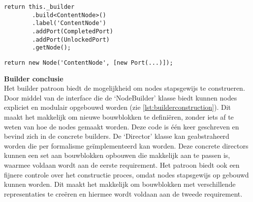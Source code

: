 \lstset{language=JavaScript}
\begin{lstlisting}[caption={Constructie stap voor stap door de 'Director', geschreven in TypeScript.},captionpos=b,label={lst:builderconstruction}]
    return this._builder
        .build<ContentNode>()
        .label('ContentNode')
        .addPort(CompletedPort)
        .addPort(UnlockedPort)
        .getNode();
\end{lstlisting}

\lstset{language=JavaScript}
\begin{lstlisting}[caption={Directe instantiatie door constructor.},captionpos=b,label={lst:constructionbyconstructor}]
    return new Node('ContentNode', [new Port(...)]);
\end{lstlisting}

\noindent\textbf{Builder conclusie}\\
Het builder patroon biedt de mogelijkheid om nodes stapsgewijs te construeren. Door middel van de interface die de ‘NodeBuilder’ klasse biedt kunnen nodes expliciet en modulair opgebouwd worden (zie \autoref{lst:builderconstruction}). Dit maakt het makkelijk om nieuwe bouwblokken te definiëren, zonder iets af te weten van hoe de nodes gemaakt worden. Deze code is één keer geschreven en bevind zich in de concrete builders. De ‘Director’ klasse kan geabstraheerd worden die per formalisme geïmplementeerd kan worden. Deze concrete directors kunnen een set aan bouwblokken opbouwen die makkelijk aan te passen is, waarmee voldaan wordt aan de eerste requirement. Het patroon biedt ook een fijnere controle over het constructie proces, omdat nodes stapsgewijs op gebouwd kunnen worden. Dit maakt het makkelijk om bouwblokken met verschillende representaties te creëren en hiermee wordt voldaan aan de tweede requirement.

               


